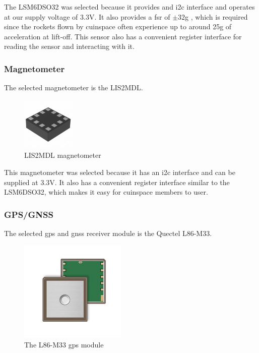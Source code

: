 The LSM6DSO32 was selected because it provides and \gls{i2c} interface and operates at our supply voltage of 3.3V.
\cite{lsm6dso32-datasheet} It also provides a \gls{fsr} of $\pm 32$g \cite[1]{lsm6dso32-datasheet}, which is required
since the rockets flown by \gls{cuinspace} often experience up to around 25g of acceleration at lift-off. This sensor
also has a convenient register interface for reading the sensor and interacting with it.

\subsubsection{Magnetometer}

The selected magnetometer is the LIS2MDL.

\begin{figure}[H]
    \centering
    \includegraphics[width=1in]{assets/images/lis2mdl.jpg}
    \caption{LIS2MDL magnetometer \cite{lis2dml-pic}}
    \label{fig:magnetometer}
\end{figure}

This magnetometer was selected because it has an \gls{i2c} interface and can be supplied at 3.3V.
\cite{lis2mdl-datasheet} It also has a convenient register interface similar to the LSM6DSO32, which makes it easy for
\gls{cuinspace} members to user.

\subsubsection{GPS/GNSS}

The selected \gls{gps} and \gls{gnss} receiver module is the Quectel L86-M33.

\begin{figure}[H]
    \center
    \includegraphics[width=2in]{assets/images/l86m33.png}
    \caption{The L86-M33 \gls{gps} module \cite{gps-pic}}
    \label{fig:gps}
\end{figure}


